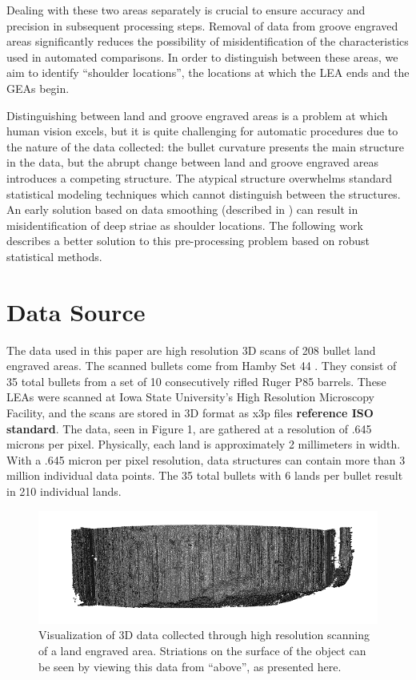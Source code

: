 \documentclass[12pt]{article}
\begin{document}
Dealing with these two areas separately is crucial to ensure accuracy
and precision in subsequent processing steps. Removal of data from
groove engraved areas significantly reduces the possibility of
misidentification of the characteristics used in automated comparisons.
In order to distinguish between these areas, we aim to identify
``shoulder locations'', the locations at which the LEA ends and the GEAs
begin.

Distinguishing between land and groove engraved areas is a problem at
which human vision excels, but it is quite challenging for automatic
procedures due to the nature of the data collected: the bullet curvature
presents the main structure in the data, but the abrupt change between
land and groove engraved areas introduces a competing structure. The
atypical structure overwhelms standard statistical modeling techniques
which cannot distinguish between the structures. An early solution based
on data smoothing (described in \citep{Hare1}) can result in
misidentification of deep striae as shoulder locations. The following
work describes a better solution to this pre-processing problem based on
robust statistical methods.

\section{Data Source}

The data used in this paper are high resolution 3D scans of 208 bullet
land engraved areas. The scanned bullets come from Hamby Set 44
\citep{Hamby}. They consist of 35 total bullets from a set of 10
consecutively rifled Ruger P85 barrels. These LEAs were scanned at Iowa
State University's High Resolution Microscopy Facility, and the scans
are stored in 3D format as x3p files \textbf{reference ISO standard}.
The data, seen in Figure 1, are gathered at a resolution of .645 microns
per pixel. Physically, each land is approximately 2 millimeters in
width. With a .645 micron per pixel resolution, data structures can
contain more than 3 million individual data points. The 35 total bullets
with 6 lands per bullet result in 210 individual lands.

\begin{figure}[htbp]
\centering
\includegraphics[width=6.25000in]{./images/3d_plot_top.png}
\caption{Visualization of 3D data collected through high resolution
scanning of a land engraved area. Striations on the surface of the
object can be seen by viewing this data from ``above'', as presented
here.}
\end{figure}
\end{document}
